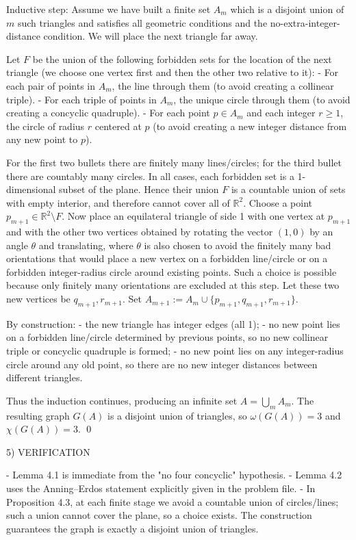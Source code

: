 Inductive step:
Assume we have built a finite set $A_m$ which is a disjoint union of $m$ such triangles and satisfies all geometric conditions and the no-extra-integer-distance condition.
We will place the next triangle far away.

Let $F$ be the union of the following forbidden sets for the location of the next triangle (we choose one vertex first and then the other two relative to it):
- For each pair of points in $A_m$, the line through them (to avoid creating a collinear triple).
- For each triple of points in $A_m$, the unique circle through them (to avoid creating a concyclic quadruple).
- For each point $p\in A_m$ and each integer $r\ge 1$, the circle of radius $r$ centered at $p$ (to avoid creating a new integer distance from any new point to $p$).

For the first two bullets there are finitely many lines/circles; for the third bullet there are countably many circles.
In all cases, each forbidden set is a 1-dimensional subset of the plane.
Hence their union $F$ is a countable union of sets with empty interior, and therefore cannot cover all of $\mathbb{R}^2$.
Choose a point $p_{m+1}\in \mathbb{R}^2\setminus F$.
Now place an equilateral triangle of side 1 with one vertex at $p_{m+1}$ and with the other two vertices obtained by rotating the vector $(1,0)$ by an angle $\theta$ and translating, where $\theta$ is also chosen to avoid the finitely many bad orientations that would place a new vertex on a forbidden line/circle or on a forbidden integer-radius circle around existing points.
Such a choice is possible because only finitely many orientations are excluded at this step.
Let these two new vertices be $q_{m+1},r_{m+1}$.
Set $A_{m+1}:=A_m\cup\{p_{m+1},q_{m+1},r_{m+1}\}$.

By construction:
- the new triangle has integer edges (all 1);
- no new point lies on a forbidden line/circle determined by previous points, so no new collinear triple or concyclic quadruple is formed;
- no new point lies on any integer-radius circle around any old point, so there are no new integer distances between different triangles.

Thus the induction continues, producing an infinite set $A=\bigcup_m A_m$.
The resulting graph $G(A)$ is a disjoint union of triangles, so $\omega(G(A))=3$ and $\chi(G(A))=3$. \qed

5) VERIFICATION

- Lemma 4.1 is immediate from the "no four concyclic" hypothesis.
- Lemma 4.2 uses the Anning--Erdos statement explicitly given in the problem file.
- In Proposition 4.3, at each finite stage we avoid a countable union of circles/lines; such a union cannot cover the plane, so a choice exists. The construction guarantees the graph is exactly a disjoint union of triangles.

